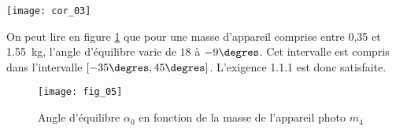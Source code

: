 \ifprof
\else
{}
\fi

\ifprof
\begin{marginfigure}
\texttt{[image: cor\_03]}
\end{marginfigure}
\begin{corrige} 

On peut lire en figure \ref{Cy_11_Ch_03_PFS_2D_TD_05_fig_05} que pour une masse d'appareil comprise entre 0,35 et \SI{1,55}{kg}, l'angle d'équilibre varie de $18$ à $-9\degres$. Cet intervalle est compris dans l'intervalle $\left[-35\degres,45\degres\right]$. L'exigence 1.1.1 est donc satisfaite.
\end{corrige}
\else
\fi

\ifprof
\else

\begin{figure}[!h]
\texttt{[image: fig\_05]}
\caption{Angle d’équilibre $\alpha_0$ en fonction de la masse de l’appareil photo $m_4$}
\label{Cy_11_Ch_03_PFS_2D_TD_05_fig_05}
\end{figure}

\fi

